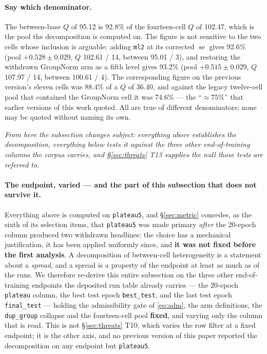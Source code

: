 \documentclass[10pt,letterpaper]{article}
\newcommand{\plateau}{\texttt{plateau5}}
\newcommand{\arm}[1]{\texttt{#1}}
\DeclareMathOperator{\se}{se}
\begin{document}
\paragraph{Say which denominator.}
The between-base $Q$ of 95.12 is 92.8\% of the fourteen-cell $Q$ of 102.47, which is the pool the
decomposition is computed on. The figure is not sensitive to the two cells whose inclusion is
arguable: adding \arm{ml2} at its corrected $\se$ gives 92.6\% (pool $+0.528 \pm 0.029$,
$Q$ 102.61 / 14, between 95.01 / 3), and restoring the withdrawn GroupNorm arm as a fifth level
gives 93.2\% (pool $+0.515 \pm 0.029$, $Q$ 107.97 / 14, between 100.61 / 4). The corresponding
figure on the previous version's eleven cells was 88.4\% of a $Q$ of 36.40, and against the legacy
twelve-cell pool that contained the GroupNorm cell it was 74.6\% --- the ``$\approx 75\%$'' that
earlier versions of this work quoted. All are true of different denominators; none may be quoted
without naming its own.

\emph{From here the subsection changes subject: everything above establishes the decomposition,
everything below tests it against the three other end-of-training columns the corpus carries, and
\S\ref{sec:threats} T13 supplies the null those tests are referred to.}

\paragraph{The endpoint, varied --- and the part of this subsection that does not survive it.}
Everything above is computed on \plateau{}, and \S\ref{sec:metric} concedes, as the sixth of its
selection items, that \plateau{} was made primary \emph{after} the 20-epoch column produced two
withdrawn headlines: the choice has a mechanical justification, it has been applied uniformly
since, and \textbf{it was not fixed before the first analysis}. A decomposition of between-cell
heterogeneity is a statement about a \emph{spread}, and a spread is a property of the endpoint at
least as much as of the runs. We therefore re-derive this entire subsection on the three other
end-of-training endpoints the deposited run table already carries --- the 20-epoch
\texttt{plateau} column, the best test epoch \texttt{best\_test}, and the last test epoch
\texttt{final\_test} --- holding the admissibility gate of \eqref{eq:adm}, the arm definitions,
the \texttt{dup\_group} collapse and the fourteen-cell pool \textbf{fixed}, and varying only the
column that is read. This is not \S\ref{sec:threats} T10, which varies the row filter at a fixed
endpoint; it is the other axis, and no previous version of this paper reported the decomposition
on any endpoint but \plateau{}.
\end{document}
